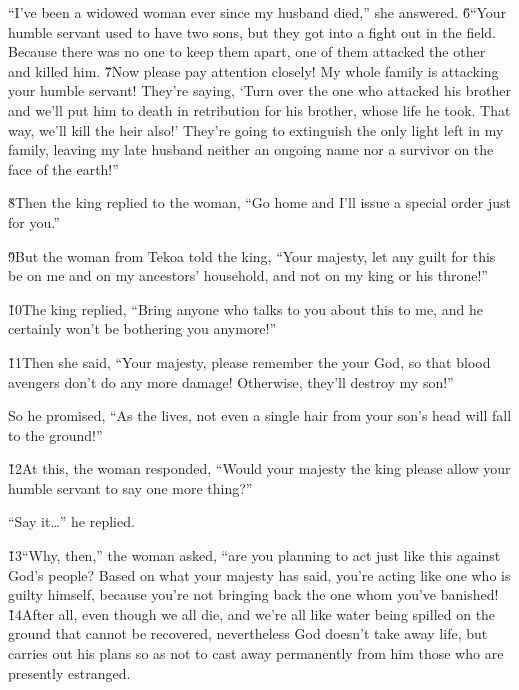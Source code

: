 ``I've been a widowed woman ever since my husband died,'' she answered. \v{6}``Your humble servant used to have two sons, but they got into a fight out in the field. Because there was no one to keep them apart, one of them attacked the other and killed him. \v{7}Now please pay attention closely! My whole family is attacking your humble servant! They're saying, `Turn over the one who attacked his brother and we'll put him to death in retribution for his brother, whose life he took. That way, we'll kill the heir also!' They're going to extinguish the only light left in my family, leaving my late husband neither an ongoing name nor a survivor on the face of the earth!''

\v{8}Then the king replied to the woman, ``Go home and I'll issue a special order just for you.''

\v{9}But the woman from Tekoa told the king, ``Your majesty, let any guilt for this be on me and on my ancestors' household, and not on my king or his throne!''

\v{10}The king replied, ``Bring anyone who talks to you about this to me, and he certainly won't be bothering you anymore!''

\v{11}Then she said, ``Your majesty, please remember the  your God, so that blood avengers don't do any more damage! Otherwise, they'll destroy my son!''

So he promised, ``As the  lives, not even a single hair from your son's head will fall to the ground!''

\v{12}At this, the woman responded, ``Would your majesty the king please allow your humble servant to say one more thing?''

``Say it{\ldots}'' he replied.

\v{13}``Why, then,'' the woman asked, ``are you planning to act just like this against God's people? Based on what your majesty has said, you're acting like one who is guilty himself, because you're not bringing back the one whom you've banished! \v{14}After all, even though we all die, and we're all like water being spilled on the ground that cannot be recovered, nevertheless God doesn't take away life, but carries out his plans so as not to cast away permanently from him those who are presently estranged.

